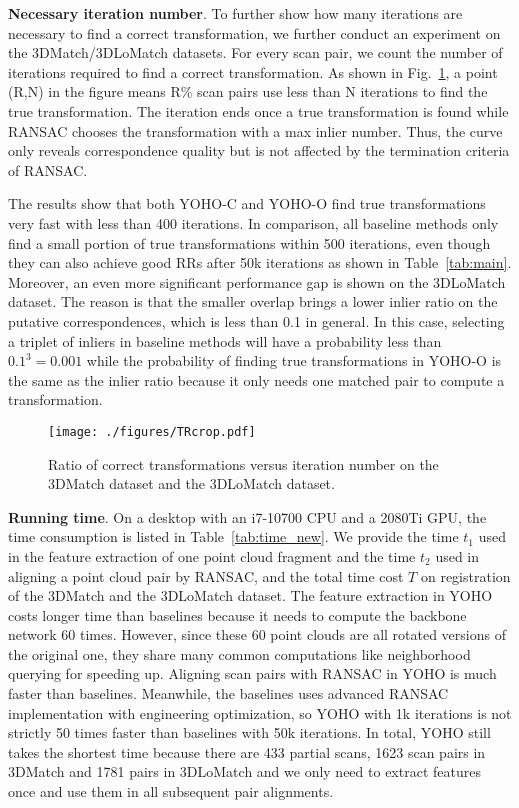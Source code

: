 



\textbf{Necessary iteration number}. To further show how many iterations are necessary to find a correct transformation, we further conduct an experiment on the 3DMatch/3DLoMatch datasets. For every scan pair, we count the number of iterations required to find a correct transformation. As shown in Fig.~\ref{fig:TR}, a point (R,N) in the figure means R\% scan pairs use less than N iterations to find the true transformation. 
The iteration ends once a true transformation is found while RANSAC chooses the transformation with a max inlier number. Thus, the curve only reveals correspondence quality but is not affected by the termination criteria of RANSAC. 

The results show that both YOHO-C and YOHO-O find true transformations very fast with less than 400 iterations. In comparison, all baseline methods only find a small portion of true transformations within 500 iterations, even though they can also achieve good RRs after 50k iterations as shown in Table~\ref{tab:main}. 
Moreover, an even more significant performance gap is shown on the 3DLoMatch dataset. The reason is that the smaller overlap brings a lower inlier ratio on the putative correspondences, which is less than 0.1 in general. In this case, selecting a triplet of inliers in baseline methods will have a probability less than $0.1^3=0.001$ while the probability of finding true transformations in YOHO-O is the same as the inlier ratio because it only needs one matched pair to compute a transformation.


\begin{figure}
\begin{center}
\texttt{[image: ./figures/TRcrop.pdf]}
\vspace{-15pt}
\end{center}
   \caption{Ratio of correct transformations versus iteration number on the 3DMatch dataset and the 3DLoMatch dataset.}
\label{fig:TR}
\vspace{-15pt}
\end{figure}


\textbf{Running time}.
On a desktop with an i7-10700 CPU and a 2080Ti GPU, the time consumption is listed in Table~\ref{tab:time_new}. We provide the time $t_1$ used in the feature extraction of one point cloud fragment and the time $t_2$ used in aligning a point cloud pair by RANSAC, and the total time cost $T$ on registration of the 3DMatch and the 3DLoMatch dataset. The feature extraction in YOHO costs longer time than baselines because it needs to compute the backbone network 60 times. 
However, since these 60 point clouds are all rotated versions of the original one, they share many common computations like neighborhood querying for speeding up. 
Aligning scan pairs with RANSAC in YOHO is much faster than baselines. Meanwhile, the baselines uses advanced RANSAC implementation with engineering optimization, so YOHO with 1k iterations is not strictly 50 times faster than baselines with 50k iterations. In total, YOHO still takes the shortest time because there are 433 partial scans, 1623 scan pairs in 3DMatch and 1781 pairs in 3DLoMatch and we only need to extract features once and use them in all subsequent pair alignments.

